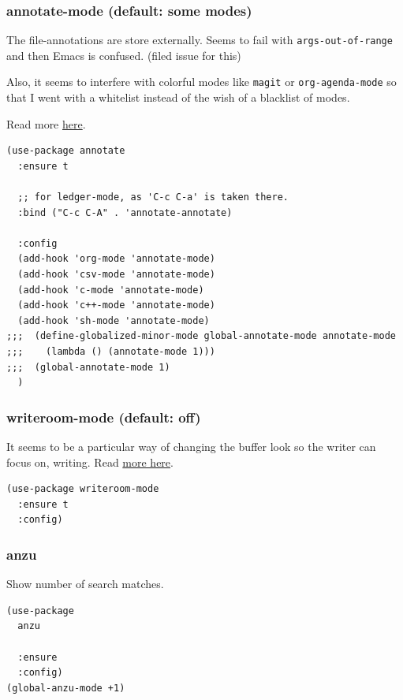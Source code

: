 \documentclass[11pt]{article}
\begin{document}
\subsubsection{annotate-mode (default: some modes)}
\label{sec:orge622e3d}

The file-annotations are store externally. Seems to fail with
\texttt{args-out-of-range} and then Emacs is confused. (filed issue for this)

Also, it seems to interfere with colorful modes like \texttt{magit} or
\texttt{org-agenda-mode} so that I went with a whitelist instead of the wish of
a blacklist of modes.

Read more \href{https://github.com/bastibe/annotate.el}{here}.

\begin{verbatim}
(use-package annotate
  :ensure t

  ;; for ledger-mode, as 'C-c C-a' is taken there.
  :bind ("C-c C-A" . 'annotate-annotate)

  :config
  (add-hook 'org-mode 'annotate-mode)
  (add-hook 'csv-mode 'annotate-mode)
  (add-hook 'c-mode 'annotate-mode)
  (add-hook 'c++-mode 'annotate-mode)
  (add-hook 'sh-mode 'annotate-mode)
;;;  (define-globalized-minor-mode global-annotate-mode annotate-mode
;;;    (lambda () (annotate-mode 1)))
;;;  (global-annotate-mode 1)
  )
\end{verbatim}

\subsubsection{writeroom-mode (default: off)}
\label{sec:orgf847dd3}

It seems to be a particular way of changing the buffer look so the
writer can focus on, writing. Read \href{https://github.com/joostkremers/writeroom-mode}{more here}.

\begin{verbatim}
(use-package writeroom-mode
  :ensure t
  :config)
\end{verbatim}

\subsubsection{anzu}
\label{sec:org9e9ced4}

Show number of search matches.

\begin{verbatim}
(use-package
  anzu

  :ensure
  :config)
(global-anzu-mode +1)
\end{verbatim}
\end{document}
